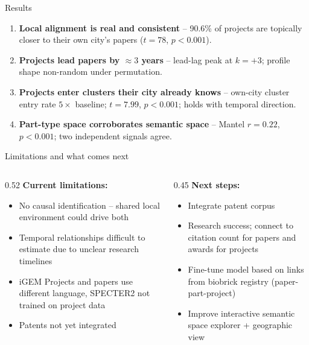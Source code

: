 \documentclass[10pt,aspectratio=169]{beamer}
\begin{document}
\begin{frame}{Results}
\begin{enumerate}
  \item \textbf{Local alignment is real and consistent} -- 90.6\% of projects are topically closer to their own city's papers ($t = 78$, $p < 0.001$).
  \item \textbf{Projects lead papers by $\approx 3$ years} -- lead-lag peak at $k = +3$; profile shape non-random under permutation.
  \item \textbf{Projects enter clusters their city already knows} -- own-city cluster entry rate $5\times$ baseline; $t = 7.99$, $p < 0.001$; holds with temporal direction.
  \item \textbf{Part-type space corroborates semantic space} -- Mantel $r = 0.22$, $p < 0.001$; two independent signals agree.
\end{enumerate}
\end{frame}

\begin{frame}{Limitations and what comes next}
\begin{columns}[T]
\begin{column}{0.52\textwidth}
  \textbf{Current limitations:}
  \begin{itemize}
    \item No causal identification -- shared local environment could drive both
    \item Temporal relationships difficult to estimate due to unclear research timelines
    \item iGEM Projects and papers use different language, SPECTER2 not trained on project data
    \item Patents not yet integrated
  \end{itemize}
\end{column}
\begin{column}{0.45\textwidth}
  \textbf{Next steps:}
  \begin{itemize}
    \item Integrate patent corpus
    \item Research success; connect to citation count for papers and awards for projects
    \item Fine-tune model based on links from biobrick registry (paper-part-project)
    \item Improve interactive semantic space explorer + geographic view
  \end{itemize}
\end{column}
\end{columns}
\end{frame}
\end{document}
